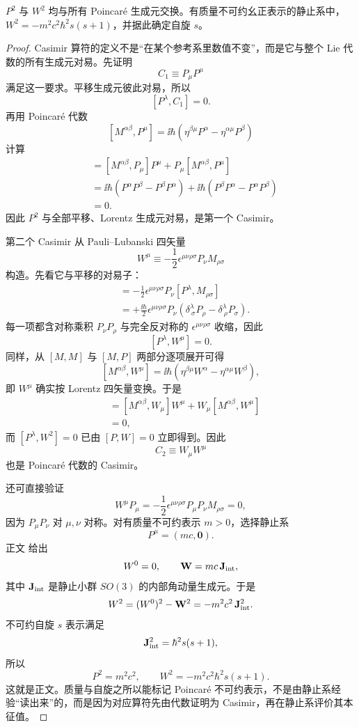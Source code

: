 \begin{theorem}
$P^2$ 与 $W^2$ 均与所有 Poincaré 生成元交换。有质量不可约幺正表示的静止系中，$W^2=-m^2c^2\hbar^2s(s+1)$，并据此确定自旋 $s$。
\end{theorem}
\begin{proof}
Casimir 算符的定义不是“在某个参考系里数值不变”，而是它与整个 Lie 代数的所有生成元对易。先证明
\[
C_1\equiv P_\mu P^\mu
\]
满足这一要求。平移生成元彼此对易，所以
\[
[P^\lambda,C_1]=0.
\]
再用 Poincar\'e 代数
\[
[M^{\alpha\beta},P^\mu]
=\ii\hbar
\left(
\eta^{\beta\mu}P^\alpha
-\eta^{\alpha\mu}P^\beta
\right)
\]
计算
\begin{align*}
[M^{\alpha\beta},P_\mu P^\mu]
&=[M^{\alpha\beta},P_\mu]P^\mu
+P_\mu[M^{\alpha\beta},P^\mu]\\
&=\ii\hbar
\left(
P^\alpha P^\beta-P^\beta P^\alpha
\right)
+\ii\hbar
\left(
P^\beta P^\alpha-P^\alpha P^\beta
\right)\\
&=0.
\end{align*}
因此 \(P^2\) 与全部平移、Lorentz 生成元对易，是第一个 Casimir。

第二个 Casimir 从 Pauli--Lubanski 四矢量
\[
W^\mu
\equiv
-\frac12\epsilon^{\mu\nu\rho\sigma}
P_\nu M_{\rho\sigma}
\]
构造。先看它与平移的对易子：
\begin{align*}
[P^\lambda,W^\mu]
&=-\frac12\epsilon^{\mu\nu\rho\sigma}
P_\nu[P^\lambda,M_{\rho\sigma}]\\
&=+\frac{\ii\hbar}{2}
\epsilon^{\mu\nu\rho\sigma}
P_\nu
\left(
\delta^\lambda_{\ \sigma}P_\rho
-\delta^\lambda_{\ \rho}P_\sigma
\right).
\end{align*}
每一项都含对称乘积 \(P_\nu P_\rho\) 与完全反对称的
\(\epsilon^{\mu\nu\rho\sigma}\) 收缩，因此
\[
[P^\lambda,W^\mu]=0.
\]
同样，从 \([M,M]\) 与 \([M,P]\) 两部分逐项展开可得
\[
[M^{\alpha\beta},W^\mu]
=\ii\hbar
\left(
\eta^{\beta\mu}W^\alpha
-\eta^{\alpha\mu}W^\beta
\right),
\]
即 \(W^\mu\) 确实按 Lorentz 四矢量变换。于是
\begin{align*}
[M^{\alpha\beta},W_\mu W^\mu]
&=[M^{\alpha\beta},W_\mu]W^\mu
+W_\mu[M^{\alpha\beta},W^\mu]\\
&=0,
\end{align*}
而 \([P^\lambda,W^2]=0\) 已由 \([P,W]=0\) 立即得到。因此
\[
C_2\equiv W_\mu W^\mu
\]
也是 Poincar\'e 代数的 Casimir。

还可直接验证
\[
W^\mu P_\mu
=
-\frac12
\epsilon^{\mu\nu\rho\sigma}
P_\mu P_\nu M_{\rho\sigma}
=0,
\]
因为 \(P_\mu P_\nu\) 对 \(\mu,\nu\) 对称。对有质量不可约表示 \(m>0\)，选择静止系
\[
P^\mu=(mc,\mathbf0).
\]
正文 给出
\[
W^0=0,
\qquad
\mathbf W=mc\,\mathbf J_{\rm int},
\]
其中 \(\mathbf J_{\rm int}\) 是静止小群 \(SO(3)\) 的内部角动量生成元。于是
\[
W^2
=(W^0)^2-\mathbf W^2
=-m^2c^2\,\mathbf J_{\rm int}^2.
\]
不可约自旋 \(s\) 表示满足
\[
\mathbf J_{\rm int}^2
=\hbar^2s(s+1),
\]
所以
\[
\boxed{
P^2=m^2c^2,
\qquad
W^2=-m^2c^2\hbar^2s(s+1).
}
\]
这就是正文。质量与自旋之所以能标记 Poincar\'e 不可约表示，不是由静止系经验“读出来”的，而是因为对应算符先由代数证明为 Casimir，再在静止系评价其本征值。
\end{proof}

